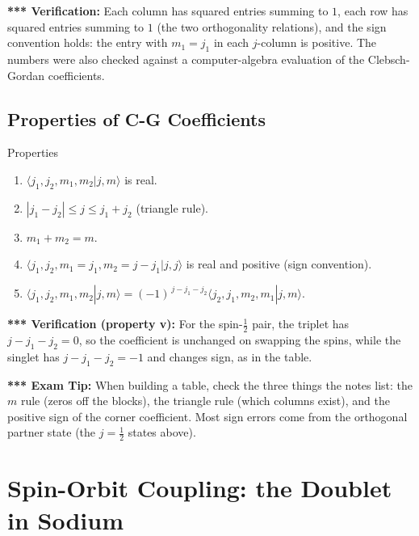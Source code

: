 \documentclass[11pt,a4paper]{article}
\begin{document}
\textbf{*** Verification:} Each column has squared entries summing to $1$, each row has squared entries summing to $1$ (the two orthogonality relations), and the sign convention holds: the entry with $m_1=j_1$ in each $j$-column is positive. The numbers were also checked against a computer-algebra evaluation of the Clebsch-Gordan coefficients.

\subsection{Properties of C-G Coefficients}
\begin{thm}{Properties}
\begin{enumerate}[label=(\roman*),leftmargin=2em,itemsep=2pt]
\item $\langle j_1,j_2,m_1,m_2|j,m\rangle$ is real.
\item $|j_1-j_2|\le j\le j_1+j_2$ (triangle rule).
\item $m_1+m_2=m$.
\item $\langle j_1,j_2,m_1=j_1,m_2=j-j_1|j,j\rangle$ is real and positive (sign convention).
\item $\langle j_1,j_2,m_1,m_2|j,m\rangle=(-1)^{\,j-j_1-j_2}\langle j_2,j_1,m_2,m_1|j,m\rangle$.
\end{enumerate}
\end{thm}

\textbf{*** Verification (property v):} For the spin-$\tfrac12$ pair, the triplet has $j-j_1-j_2=0$, so the coefficient is unchanged on swapping the spins, while the singlet has $j-j_1-j_2=-1$ and changes sign, as in the table.

\textbf{*** Exam Tip:} When building a table, check the three things the notes list: the $m$ rule (zeros off the blocks), the triangle rule (which columns exist), and the positive sign of the corner coefficient. Most sign errors come from the orthogonal partner state (the $j=\tfrac12$ states above).

\section{Spin-Orbit Coupling: the Doublet in Sodium}
\label{sy:sec:so}
\end{document}
